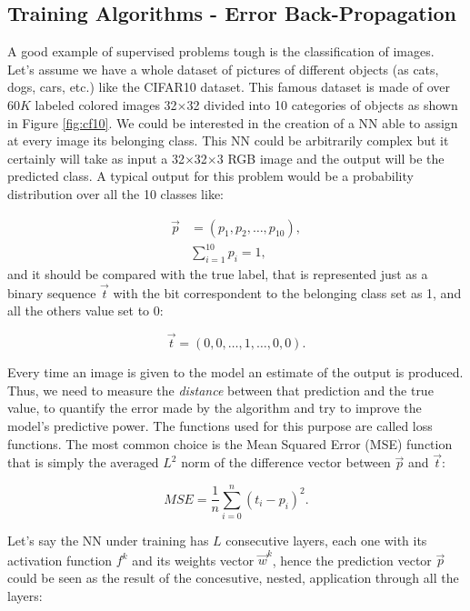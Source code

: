 \subsection{Training Algorithms - Error Back-Propagation}

A good example of supervised problems tough is the classification of images. Let's assume we have a whole dataset of pictures of different objects (as cats, dogs, cars, etc.) like the CIFAR10 \cite{cifar10} dataset. This famous dataset is made of over 60$K$ labeled colored images 32$\times$32 divided into 10 categories of objects as shown in Figure \ref{fig:cf10}. We could be interested in the creation of a NN able to assign at every image its belonging class. This NN could be arbitrarily complex but it certainly will take as input a 32$\times$32$\times$3 RGB image and the output will be the predicted class. A typical output for this problem would be a probability distribution over all the 10 classes like:

\begin{align}
    \vec p & = (p_1, p_2, \dots, p_{10}), \\
    &\sum_{i=1}^{10} p_i = 1,
\end{align}
and it should be compared with the true label, that is represented just as a binary sequence $\vec t$ with the bit correspondent to the belonging class set as 1, and all the others value set to 0:

\begin{equation}
    \vec t = (0,0,\dots, 1, \dots,0,0).
\end{equation}

Every time an image is given to the model an estimate of the output is produced. Thus, we need to measure the \textit{distance} between that prediction and the true value, to quantify the error made by the algorithm and try to improve the model's predictive power. The functions used for this purpose are called loss functions. The most common choice is the Mean Squared Error (MSE) function that is simply the averaged $L^2$ norm of the difference vector between $\vec p$ and $\vec t$:

\begin{equation}
    MSE = \frac{1}{n} \sum_{i=0}^{n} (t_i - p_i)^2.
    \label{eq:MSE}
\end{equation}

Let's say the NN under training has $L$ consecutive layers, each one with its activation function $f^k$ and its weights vector $\vec w^k$, hence the prediction vector $\vec p$ could be seen as the result of the concesutive, nested, application through all the layers:


